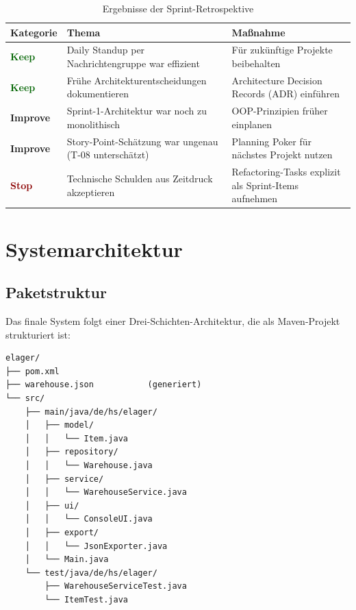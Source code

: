 \documentclass[12pt, a4paper, twoside]{report}
\begin{document}
\begin{table}[H]
  \centering
  \caption{Ergebnisse der Sprint-Retrospektive}
  \label{tab:retro}
  \begin{tabularx}{\textwidth}{L{2cm} L{5cm} L{6cm}}
    \toprule
    \textbf{Kategorie} & \textbf{Thema} & \textbf{Maßnahme} \\
    \midrule
    \textcolor{darkGreen}{\textbf{Keep}}
      & Daily Standup per Nachrichtengruppe war effizient
      & Für zukünftige Projekte beibehalten \\
    \textcolor{darkGreen}{\textbf{Keep}}
      & Frühe Architekturentscheidungen dokumentieren
      & Architecture Decision Records (ADR) einführen \\
    \textcolor{orange!80!black}{\textbf{Improve}}
      & Sprint-1-Architektur war noch zu monolithisch
      & OOP-Prinzipien früher einplanen \\
    \textcolor{orange!80!black}{\textbf{Improve}}
      & Story-Point-Schätzung war ungenau (T-08 unterschätzt)
      & Planning Poker für nächstes Projekt nutzen \\
    \textcolor{darkRed}{\textbf{Stop}}
      & Technische Schulden aus Zeitdruck akzeptieren
      & Refactoring-Tasks explizit als Sprint-Items aufnehmen \\
    \bottomrule
  \end{tabularx}
\end{table}

\chapter{Systemarchitektur}
\label{chap:architektur}

\section{Paketstruktur}

Das finale System folgt einer Drei-Schichten-Architektur, die als Maven-Projekt strukturiert ist:

\begin{verbatim}
elager/
├── pom.xml
├── warehouse.json           (generiert)
└── src/
    ├── main/java/de/hs/elager/
    │   ├── model/
    │   │   └── Item.java
    │   ├── repository/
    │   │   └── Warehouse.java
    │   ├── service/
    │   │   └── WarehouseService.java
    │   ├── ui/
    │   │   └── ConsoleUI.java
    │   ├── export/
    │   │   └── JsonExporter.java
    │   └── Main.java
    └── test/java/de/hs/elager/
        ├── WarehouseServiceTest.java
        └── ItemTest.java
\end{verbatim}
\end{document}
